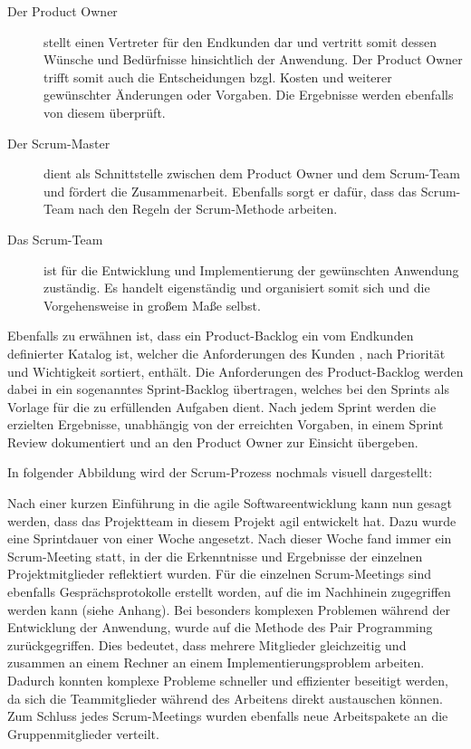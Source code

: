\begin{description}
\item[Der Product Owner] stellt einen Vertreter für den Endkunden dar und
vertritt somit dessen Wünsche und Bedürfnisse hinsichtlich der Anwendung. Der
Product Owner trifft somit auch die Entscheidungen bzgl. Kosten und weiterer
gewünschter Änderungen oder Vorgaben. Die Ergebnisse werden ebenfalls von
diesem überprüft.
\item[Der Scrum-Master] dient als Schnittstelle zwischen dem Product Owner und
dem Scrum-Team und fördert die Zusammenarbeit. Ebenfalls sorgt er dafür, dass
das Scrum-Team nach den Regeln der Scrum-Methode arbeiten.
\item[Das Scrum-Team] ist für die Entwicklung und Implementierung der
gewünschten Anwendung zuständig. Es handelt eigenständig und organisiert somit
sich und die Vorgehensweise in großem Maße selbst.
\end{description}

Ebenfalls zu erwähnen ist, dass ein Product-Backlog ein vom Endkunden
definierter Katalog ist, welcher die Anforderungen des Kunden , nach Priorität
und Wichtigkeit sortiert, enthält. Die Anforderungen des Product-Backlog werden
dabei in ein sogenanntes Sprint-Backlog übertragen, welches bei den Sprints als
Vorlage für die zu erfüllenden Aufgaben dient. Nach jedem Sprint werden die
erzielten Ergebnisse, unabhängig von der erreichten Vorgaben, in einem Sprint
Review dokumentiert und an den Product Owner zur Einsicht übergeben.

In folgender Abbildung wird der Scrum-Prozess nochmals visuell dargestellt:

Nach einer kurzen Einführung in die agile Softwareentwicklung kann nun gesagt
werden, dass das Projektteam in diesem Projekt agil entwickelt hat. Dazu wurde
eine Sprintdauer von einer Woche angesetzt. Nach dieser Woche fand immer ein
Scrum-Meeting statt, in der die Erkenntnisse und Ergebnisse der einzelnen
Projektmitglieder reflektiert wurden. Für die einzelnen Scrum-Meetings sind
ebenfalls Gesprächsprotokolle erstellt worden, auf die im Nachhinein
zugegriffen werden kann (siehe Anhang). Bei besonders komplexen Problemen
während der Entwicklung der Anwendung, wurde auf die Methode des Pair
Programming zurückgegriffen. Dies bedeutet, dass mehrere Mitglieder
gleichzeitig und zusammen an einem Rechner an einem Implementierungsproblem
arbeiten. Dadurch konnten komplexe Probleme schneller und effizienter beseitigt
werden, da sich die Teammitglieder während des Arbeitens direkt austauschen
können. Zum Schluss jedes Scrum-Meetings wurden ebenfalls neue Arbeitspakete an
die Gruppenmitglieder verteilt.

